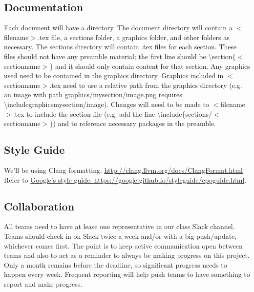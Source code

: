 \subsection*{Documentation}
Each document will have a directory. The document directory will contain a $<$filename$>$.tex file, a sections folder, a graphics folder, and other folders as necessary. The sections directory will contain .tex files for each section. These files should not have any preamble material; the first line should be \textbackslash section\{$<$sectionname$>$\} and it should only contain content for that section. Any graphics used need to be contained in the graphics directory. Graphics included in $<$sectionname$>$.tex need to use a relative path from the graphics directory (e.g. an image with path graphics/mysection/image.png requires \textbackslash includegraphics{mysection/image}). Changes will need to be made to $<$filename$>$.tex to include the section file (e.g. add the line \textbackslash include\{sections/$<$sectionname$>$\}) and to reference necessary packages in the preamble.
\subsection*{Style Guide}
We'll be using Clang formatting. \href{http://clang.llvm.org/docs/ClangFormat.html}{http://clang.llvm.org/docs/ClangFormat.html} \\
Refer to \href{https://google.github.io/styleguide/cppguide.html}{Google's style guide: https://google.github.io/styleguide/cppguide.html}.
\subsection*{Collaboration}
All teams need to have at lease one representative in our class Slack channel. Teams should check in on Slack twice a week and/or with a big push/update, whichever comes first. The point is to keep active communication open between teams and also to act as a reminder to always be making progress on this project. Only a month remains before the deadline, so significant progress needs to happen every week. Frequent reporting will help push teams to have something to report and make progress.